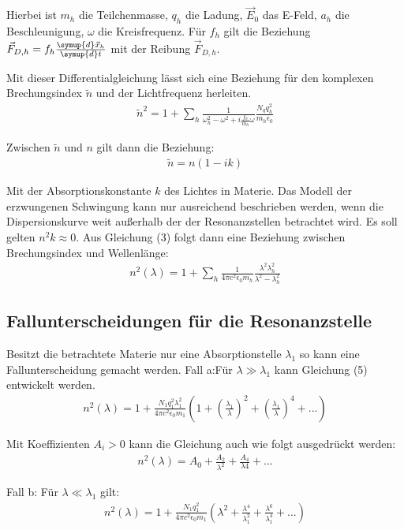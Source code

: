 Hierbei ist $m_h$ die Teilchenmasse,  $q_h$ die Ladung, $\vec{E}_0$ das E-Feld,  $a_h$ die Beschleunigung,  $\omega$ die Kreisfrequenz.
Für $f_h$ gilt die Beziehung $\vec{F}_{D,h} = f_h \frac{\symup{d} \vec{x}_h}{\symup{d}t}$ mit der Reibung $\vec{F}_{D,h}$.

Mit dieser Differentialgleichung lässt sich eine Beziehung für den komplexen Brechungsindex $\tilde{n}$ und der Lichtfrequenz herleiten.
\begin{align}
  \tilde{n}^2 = 1+ \sum_{h} \frac{1}{\omega_h^2 - \omega^2 + i \frac{f_h}{m_h}\omega} \frac{N_q q_h^2}{m_h \epsilon_0}
\end{align}

Zwischen $\tilde{n}$ und $n$ gilt dann die Beziehung:
\begin{align}
\tilde{n} = n(1-ik)
\end{align}

Mit der Absorptionskonstante $k$ des Lichtes in Materie. Das Modell der erzwungenen Schwingung kann nur ausreichend beschrieben werden, wenn die
Dispersionskurve weit außerhalb der der Resonanzstellen betrachtet wird. Es soll gelten $n^2 k \approx 0$. Aus Gleichung (3) folgt dann eine
Beziehung zwischen Brechungsindex und Wellenlänge:
\begin{align}
  {n}^2 (\lambda) = 1+ \sum_{h} \frac{1}{4 \pi c^2 \epsilon_0 m_h} \frac{\lambda^2 \lambda_h^2}{\lambda^2-\lambda_h^2}
\end{align}


\subsection{Fallunterscheidungen für die Resonanzstelle}
Besitzt die betrachtete Materie nur eine Absorptionstelle $\lambda_1$ so kann eine Fallunterscheidung gemacht werden.
Fall a:Für $\lambda \gg \lambda_1$ kann Gleichung (5) entwickelt werden.
\begin{align}
  {n}^2 (\lambda) = 1 + \frac{N_1 q_1^2 \lambda_1^2}{4 \pi c^2 \epsilon_0 m_1} \left(1+ \left(\frac{\lambda_1}{\lambda}\right)^2
  + \left(\frac{\lambda_1}{\lambda}\right)^4 + ... \right)
\end{align}

Mit Koeffizienten $A_i > 0$ kann die Gleichung auch wie folgt ausgedrückt werden:
\begin{align}
  {n}^2 (\lambda) = A_0 + \frac{A_2}{\lambda^2} + \frac{A_4}{\lambda4} + ...
\end{align}


Fall b: Für  $\lambda \ll \lambda_1$ gilt:
\begin{align}
  {n}^2 (\lambda) = 1 + \frac{N_1 q_1^2}{4 \pi c^2 \epsilon_0 m_1} \left(\lambda^2+ \frac{\lambda^4}{\lambda_1^2}
  + \frac{\lambda^6}{\lambda_1^4} + ... \right)
\end{align}

